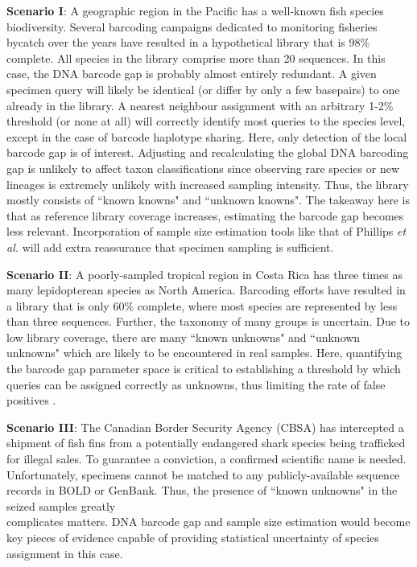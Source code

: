 \textbf{Scenario I}: A geographic region in the Pacific has a well-known fish species \\ biodiversity. Several barcoding campaigns dedicated to monitoring fisheries bycatch over the years have resulted in a hypothetical library that is 98\% complete. All species in the library comprise more than 20 sequences. In this case, the DNA barcode gap is probably almost entirely redundant. A given specimen query will likely be identical (or differ by only a few basepairs) to one already in the library. A nearest neighbour assignment with an arbitrary 1-2\% threshold (or none at all) will correctly identify most queries to the species level, except in the case of barcode haplotype sharing. Here, only detection of the local barcode gap is of interest. Adjusting and recalculating the global DNA barcoding gap is unlikely to affect taxon classifications since observing rare species or new lineages is extremely unlikely with increased sampling intensity. Thus, the library mostly consists of ``known knowns" and ``unknown knowns". The takeaway here is that as reference library coverage increases, estimating the barcode gap becomes less relevant. Incorporation of sample size estimation tools like that of Phillips \textit{et al.} \cite{phillips2020hacsim} will add extra reassurance that specimen sampling is sufficient.



\textbf{Scenario II}: A poorly-sampled tropical region in Costa Rica has three times as many lepidopterean species as North America. Barcoding efforts have resulted in a library that is only 60\% complete, where most species are represented by less than three sequences. Further, the taxonomy of many groups is uncertain. Due to low library coverage, there are many ``known unknowns" and ``unknown unknowns" which are likely to be encountered in real samples. Here, quantifying the barcode gap parameter space is critical to establishing a threshold by which queries can be assigned correctly as unknowns, thus limiting the rate of false positives \cite{dasmahapatra2010mitochondrial, hickerson2006dna}.



\textbf{Scenario III}: The Canadian Border Security Agency (CBSA) has intercepted a \\ shipment of fish fins from a potentially endangered shark species being trafficked for illegal sales. To guarantee a conviction, a confirmed scientific name is needed. Unfortunately, specimens cannot be matched to any publicly-available sequence records in BOLD or GenBank. Thus, the presence of ``known unknowns" in the seized samples greatly \\ complicates matters. DNA barcode gap and sample size estimation would become key pieces of evidence capable of providing statistical uncertainty of species assignment in this case.



